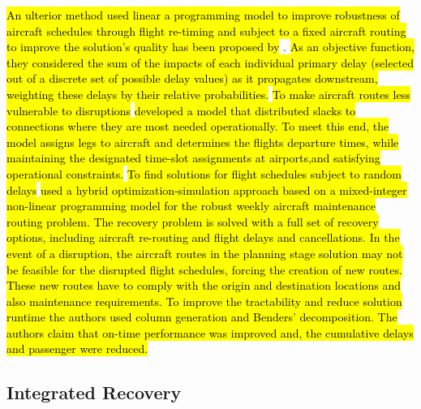 \documentclass[ijoo,nonblindrev]{informs-ijoo}
\begin{document}
\hl{An ulterior method used linear a programming model to improve robustness of aircraft schedules through flight re-timing and subject to a fixed aircraft routing to improve the solution's quality has been proposed by} \citep{AhmadBeygi2010}. \hl{As an objective function, they considered the sum of the impacts of each individual primary delay (selected out of a discrete set of possible delay values) as it propagates downstream, weighting these delays by their relative probabilities.}
\hl{To make aircraft routes less vulnerable to disruptions} \cite{Aloulou2013} \hl{developed a model that  distributed slacks to connections where they are most needed operationally. To meet this end, the model assigns legs to aircraft and determines the flights departure times, while maintaining the designated time-slot assignments at airports,and satisfying operational constraints.}
\hl{To find solutions for flight schedules subject to random delays} \citep{Ahmed2017} \hl{used a hybrid optimization-simulation approach based on a mixed-integer non-linear programming model for the robust weekly aircraft maintenance routing problem. The recovery problem is solved with a full set of recovery options, including aircraft re-routing and flight delays and cancellations. In the event of a disruption, the aircraft routes in the planning stage solution may not be feasible for the disrupted flight schedules, forcing the creation of new routes. These new routes have to comply with the origin and destination locations and also maintenance requirements. To improve the tractability and reduce solution runtime the authors used column generation and Benders' decomposition. The authors claim that on-time performance was improved and, the cumulative delays and passenger were reduced.}

\subsection{Integrated Recovery}\label{sec:integratedRecovery}
\end{document}

